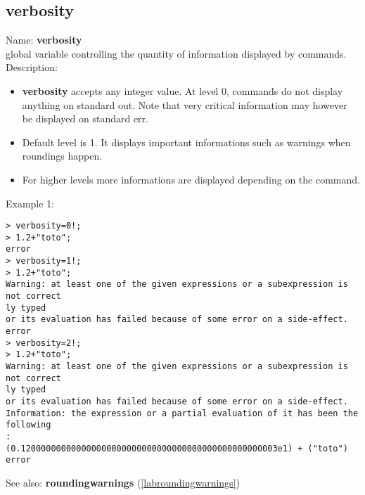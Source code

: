 \subsection{verbosity}
\label{labverbosity}
\noindent Name: \textbf{verbosity}\\
global variable controlling the quantity of information displayed by commands.\\

\noindent Description: \begin{itemize}

\item \textbf{verbosity} accepts any integer value. At level 0, commands do not display anything
   on standard out. Note that very critical information may however be displayed on
   standard err.

\item Default level is 1. It displays important informations such as warnings when 
   roundings happen.

\item For higher levels more informations are displayed depending on the command.
\end{itemize}
\noindent Example 1: 
\begin{center}\begin{minipage}{15cm}\begin{Verbatim}[frame=single]
> verbosity=0!;
> 1.2+"toto";
error
> verbosity=1!;
> 1.2+"toto";
Warning: at least one of the given expressions or a subexpression is not correct
ly typed
or its evaluation has failed because of some error on a side-effect.
error
> verbosity=2!;
> 1.2+"toto";
Warning: at least one of the given expressions or a subexpression is not correct
ly typed
or its evaluation has failed because of some error on a side-effect.
Information: the expression or a partial evaluation of it has been the following
:
(0.120000000000000000000000000000000000000000000000003e1) + ("toto")
error
\end{Verbatim}
\end{minipage}\end{center}
See also: \textbf{roundingwarnings} (\ref{labroundingwarnings})
